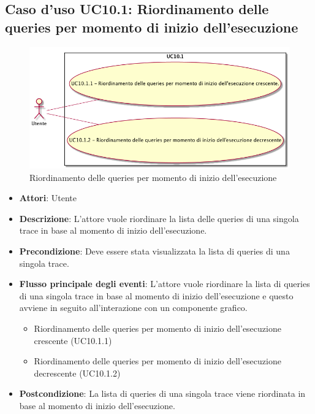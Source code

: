 \subsection{Caso d'uso UC10.1: Riordinamento delle queries per momento di inizio dell'esecuzione}
\begin{figure} [H]
\centering
\includegraphics[scale=0.45]{./UC/UC10-1.png}
\caption{Riordinamento delle queries per momento di inizio dell'esecuzione}\label{}
\end{figure}
\begin{itemize}
\item \textbf{Attori}: Utente
\item \textbf{Descrizione}: L'attore vuole riordinare la lista delle queries di una singola trace in base al momento di inizio dell'esecuzione.
\item \textbf{Precondizione}: Deve essere stata visualizzata la lista di queries di una singola trace.
\item \textbf{Flusso principale degli eventi}: L'attore vuole riordinare la lista di queries di una singola trace in base al momento di inizio dell'esecuzione e questo avviene in seguito all'interazione con un componente grafico.
\begin{itemize}
\item Riordinamento delle queries per momento di inizio dell'esecuzione crescente (UC10.1.1)
\item Riordinamento delle queries per momento di inizio dell'esecuzione decrescente (UC10.1.2)
\end{itemize}
\item \textbf{Postcondizione}: La lista di queries di una singola trace viene riordinata in base al momento di inizio dell'esecuzione.
\end{itemize}
